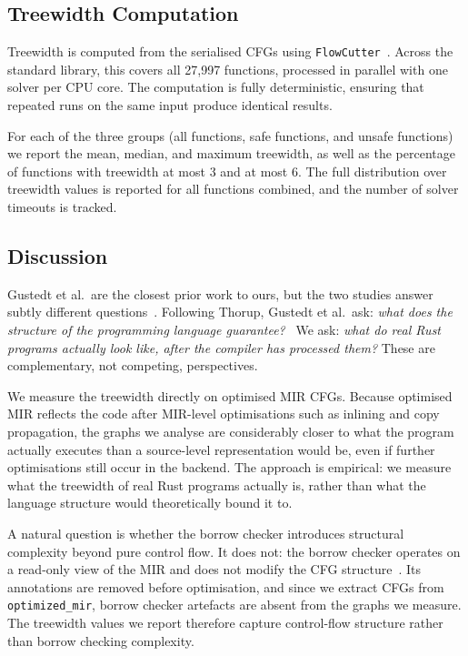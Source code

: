 \subsection{Treewidth Computation}
\label{subsec:treewidth-computation}

Treewidth is computed from the serialised CFGs using \texttt{FlowCutter}~\cite{strasser_2017}.
Across the standard library, this covers all 27,997 functions, processed in parallel with one solver per CPU core.
The computation is fully deterministic, ensuring that repeated runs on the same input produce identical results.

For each of the three groups (all functions, safe functions, and unsafe functions) we report the mean, median, and maximum treewidth, as well as the percentage of functions with treewidth at most 3 and at most 6.
The full distribution over treewidth values is reported for all functions combined, and the number of solver timeouts is tracked.

\subsection{Discussion}
\label{subsec:methodology-discussion}

Gustedt et al.\ are the closest prior work to ours, but the two studies answer subtly different questions~\cite{gustedt_2002}.
Following Thorup, Gustedt et al.\ ask: \emph{what does the structure of the programming language guarantee?}~\cite{thorup_1998}
We ask: \emph{what do real Rust programs actually look like, after the compiler has processed them?}
These are complementary, not competing, perspectives.

We measure the treewidth directly on optimised MIR CFGs.
Because optimised MIR reflects the code after MIR-level optimisations such as inlining and copy propagation, the graphs we analyse are considerably closer to what the program actually executes than a source-level representation would be, even if further optimisations still occur in the backend.
The approach is empirical: we measure what the treewidth of real Rust programs actually is, rather than what the language structure would theoretically bound it to.

A natural question is whether the borrow checker introduces structural complexity beyond pure control flow.
It does not: the borrow checker operates on a read-only view of the MIR and does not modify the CFG structure~\cite[Ch.~69]{rustc_dev_guide}.
Its annotations are removed before optimisation, and since we extract CFGs from \texttt{optimized\_mir}, borrow checker artefacts are absent from the graphs we measure.
The treewidth values we report therefore capture control-flow structure rather than borrow checking complexity.

